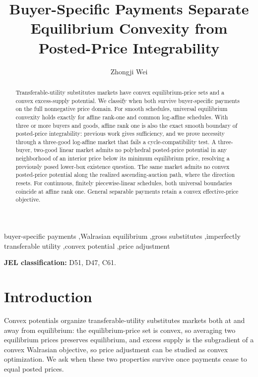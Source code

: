 

\begin{frontmatter}

\title{Buyer-Specific Payments Separate Equilibrium Convexity from Posted-Price Integrability}

\author{Zhongji Wei}

\begin{abstract}
Transferable-utility substitutes markets have convex equilibrium-price sets and a convex excess-supply potential. We classify when both survive buyer-specific payments on the full nonnegative price domain. For smooth schedules, universal equilibrium convexity holds exactly for affine rank-one and common log-affine schedules. With three or more buyers and goods, affine rank one is also the exact smooth boundary of posted-price integrability: previous work gives sufficiency, and we prove necessity through a three-good log-affine market that fails a cycle-compatibility test. A three-buyer, two-good linear market admits no polyhedral posted-price potential in any neighborhood of an interior price below its minimum equilibrium price, resolving a previously posed lower-box existence question. The same market admits no convex posted-price potential along the realized ascending-auction path, where the direction resets. For continuous, finitely piecewise-linear schedules, both universal boundaries coincide at affine rank one. General separable payments retain a convex effective-price objective.
\end{abstract}

\begin{keyword}
buyer-specific payments \sep Walrasian equilibrium \sep gross substitutes \sep imperfectly transferable utility \sep convex potential \sep price adjustment
\end{keyword}

\end{frontmatter}
\thispagestyle{plain}

\noindent\textbf{JEL classification:} D51, D47, C61.

\clearpage

\section{Introduction}\label{sec:introduction}

Convex potentials organize transferable-utility substitutes markets both at and away from equilibrium: the equilibrium-price set is convex, so averaging two equilibrium prices preserves equilibrium, and excess supply is the subgradient of a convex Walrasian objective, so price adjustment can be studied as convex optimization. We ask when these two properties survive once payments cease to equal posted prices.


